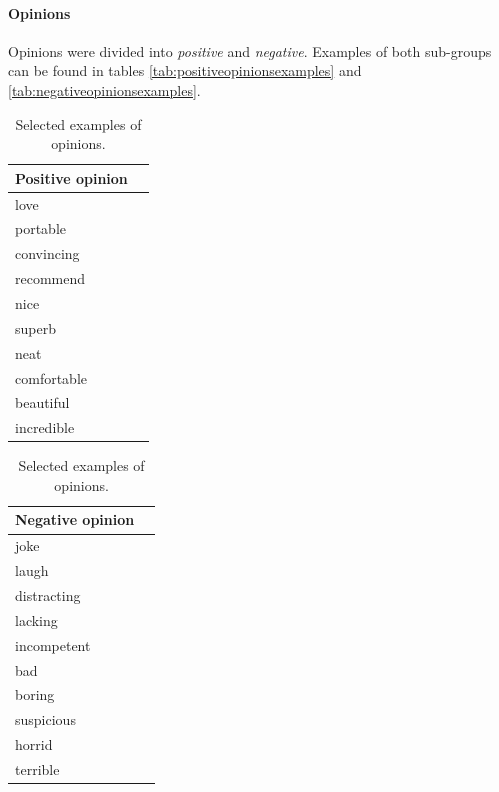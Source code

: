       \paragraph{Opinions}
      
        Opinions were divided into \emph{positive} and \emph{negative}. Examples of both sub-groups can be found in tables \ref{tab:positiveopinionsexamples} and \ref{tab:negativeopinionsexamples}.
        
        \begin{table}[H]
          \begin{subtable}{0.49\textwidth}
            \centering
            \begin{tabularx}{0.75\textwidth}{|L{1}|L{1}|} \hline
               \textbf{Positive opinion} \\\hline
              love \\
              portable \\
              convincing \\
              recommend \\
              nice \\
              superb \\
              neat \\
              comfortable \\
              beautiful \\
              incredible \\
              \hline
            \end{tabularx}
            \caption{Selected examples of positive opinions.}
            \label{tab:positiveopinionsexamples}
          \end{subtable}
          \begin{subtable}{0.49\textwidth}
            \centering
            \begin{tabularx}{0.75\textwidth}{|L{1}|L{1}|} \hline
               \textbf{Negative opinion} \\\hline
              joke \\
              laugh \\
              distracting \\
              lacking \\
              incompetent \\
              bad \\
              boring \\
              suspicious \\
              horrid \\
              terrible \\
              \hline
            \end{tabularx}
            \caption{Selected examples of negative opinions.}
            \label{tab:negativeopinionsexamples}
          \end{subtable}
          \caption{Selected examples of opinions.}
          \label{tab:opinionsexamples}
        \end{table}

